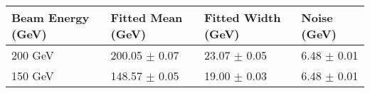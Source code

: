 \begin{table}[!htb]
\begin{center}
\begin{tabular}{|l|l|l|l|}
\hline
Beam Energy (GeV) & Fitted Mean (GeV)& Fitted Width (GeV)& Noise (GeV) \\
\hline
200 GeV  &  200.05 $\pm$    0.07 &   23.07 $\pm$    0.05 &    6.48 $\pm$    0.01 \\
150 GeV  &  148.57 $\pm$    0.05 &   19.00 $\pm$    0.03 &    6.48 $\pm$    0.01 \\

\end{tabular}
\end{center}
\end{table}
